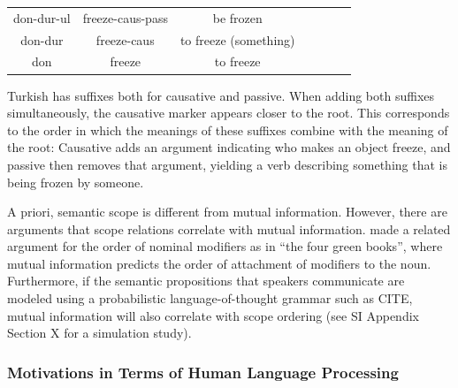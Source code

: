 \documentclass[11pt,letterpaper]{article}
\newcommand{\citet}{\Textcite}
\begin{document}
\begin{tabular}{ccccccc}
don-dur-ul & freeze-caus-pass & be frozen \\
don-dur & freeze-caus & to freeze (something) \\
don & freeze& to freeze \\
\end{tabular}

Turkish has suffixes both for causative and passive.
When adding both suffixes simultaneously, the causative marker appears closer to the root.
This corresponds to the order in which the meanings of these suffixes combine with the meaning of the root:
Causative adds an argument indicating who makes an object freeze, and passive then removes that argument, yielding a verb describing something that is being frozen by someone.

A priori, semantic scope is different from mutual information.
However, there are arguments that scope relations correlate with mutual information.
\citet{culbertson2020from} made a related argument for the order of nominal modifiers as in ``the four green books'', where mutual information predicts the order of attachment of modifiers to the noun.
Furthermore, if the semantic propositions that speakers communicate are modeled using a probabilistic language-of-thought grammar such as CITE, mutual information will also correlate with scope ordering (see SI Appendix Section X for a simulation study).




\subsubsection{Motivations in Terms of Human Language Processing}
\end{document}
